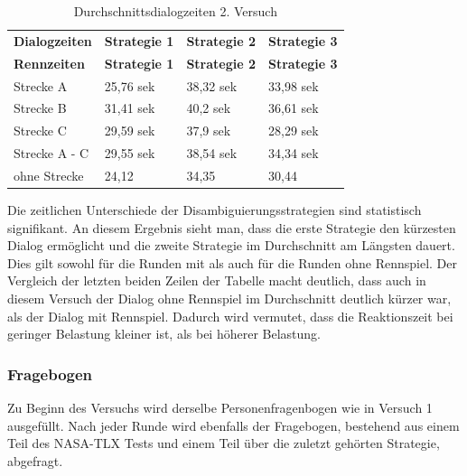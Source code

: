 \documentclass[12pt,a4paper]{scrartcl}
\begin{document}
\begin{longtable}{p{3cm}p{3cm}p{3cm}p{3cm} }
	\label{Durchschnittsdialogzeiten2}\\
	\caption[Durchschnittsdialogzeiten 2. Versuch]{Durchschnittsdialogzeiten 2. Versuch}\\
	\hline
	\textbf{Dialogzeiten}&\textbf{Strategie 1}&\textbf{Strategie 2} &\textbf{Strategie 3}\\
	\hline
	\endfirsthead
	\hline
	\textbf{Rennzeiten}&\textbf{Strategie 1}&\textbf{Strategie 2} &\textbf{Strategie 3}\\
	\hline
	\endhead
Strecke A & 25,76 sek & 38,32 sek & 33,98 sek \\
Strecke B & 31,41 sek & 40,2 sek & 36,61 sek \\
Strecke C  & 29,59 sek & 37,9 sek & 28,29 sek \\
\hline
\hline
Strecke A - C & 29,55 sek & 38,54 sek & 34,34 sek\\
\hline
ohne Strecke & 24,12 & 34,35 & 30,44 \\
\hline
\end{longtable}

Die zeitlichen Unterschiede der Disambiguierungsstrategien sind statistisch signifikant. An diesem Ergebnis sieht man, dass die erste Strategie den kürzesten Dialog ermöglicht und die zweite Strategie im Durchschnitt am Längsten dauert. Dies gilt sowohl für die Runden mit als auch für die Runden ohne Rennspiel. Der Vergleich der letzten beiden Zeilen der Tabelle macht deutlich, dass auch in diesem Versuch der Dialog ohne Rennspiel im Durchschnitt deutlich kürzer war, als der Dialog mit Rennspiel. Dadurch wird vermutet, dass die Reaktionszeit bei geringer Belastung kleiner ist, als bei höherer Belastung.  

\subsubsection{Fragebogen}
\label{fragebogen2}
Zu Beginn des Versuchs wird derselbe Personenfragenbogen wie in Versuch 1 ausgefüllt. Nach jeder Runde wird ebenfalls der Fragebogen, bestehend aus einem Teil des NASA-TLX Tests und einem Teil über die zuletzt gehörten Strategie, abgefragt.
\end{document}
